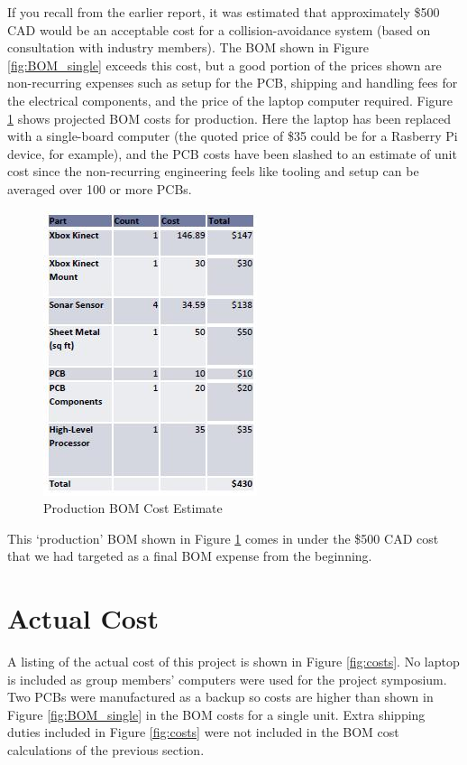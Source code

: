 \documentclass[oneside,final,a4paper]{report}
\begin{document}
If you recall from the earlier report, it was estimated that approximately \$500 CAD would be an acceptable cost for a collision-avoidance system (based on consultation with industry members). The BOM shown in Figure \ref{fig:BOM_single} exceeds this cost, but a good portion of the prices shown are non-recurring expenses such as setup for the PCB, shipping and handling fees for the electrical components, and the price of the laptop computer required. Figure \ref{fig:BOM_prod} shows  projected BOM costs for production. Here the laptop has been replaced with a single-board computer (the quoted price of \$35 could be for a Rasberry Pi device, for example), and the PCB costs have been slashed to an estimate of unit cost since the non-recurring engineering feels like tooling and setup can be averaged over 100 or more PCBs.

\begin{figure}[hbt]
 \centering
 \includegraphics[scale=0.8]{BOM_production}
 \caption{Production BOM Cost Estimate}
 \label{fig:BOM_prod}
\end{figure}

This `production' BOM shown in Figure \ref{fig:BOM_prod} comes in under the \$500 CAD cost that we had targeted as a final BOM expense from the beginning.


\section{Actual Cost}

A listing of the actual cost of this project is shown in Figure \ref{fig:costs}. No laptop is included as group members' computers were used for the project symposium. Two PCBs were manufactured as a backup so costs are higher than shown in Figure \ref{fig:BOM_single} in the BOM costs for a single unit. Extra shipping duties included in Figure \ref{fig:costs} were not included in the BOM cost calculations of the previous section.
\end{document}

